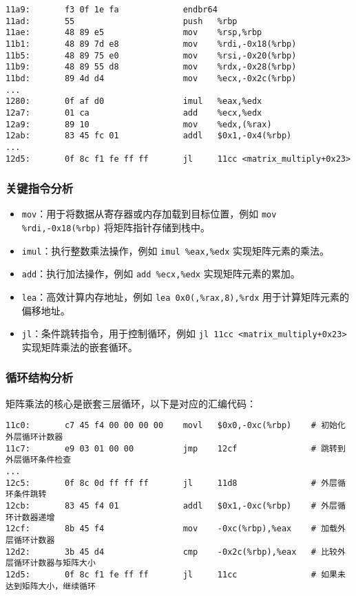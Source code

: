 \documentclass[a4paper,12pt]{ctexart}
\begin{document}
\begin{lstlisting}[caption={C语言实现的矩阵乘法关键汇编指令}]
11a9:       f3 0f 1e fa             endbr64
11ad:       55                      push   %rbp
11ae:       48 89 e5                mov    %rsp,%rbp
11b1:       48 89 7d e8             mov    %rdi,-0x18(%rbp)
11b5:       48 89 75 e0             mov    %rsi,-0x20(%rbp)
11b9:       48 89 55 d8             mov    %rdx,-0x28(%rbp)
11bd:       89 4d d4                mov    %ecx,-0x2c(%rbp)
...
1280:       0f af d0                imul   %eax,%edx
12a7:       01 ca                   add    %ecx,%edx
12a9:       89 10                   mov    %edx,(%rax)
12ab:       83 45 fc 01             addl   $0x1,-0x4(%rbp)
...
12d5:       0f 8c f1 fe ff ff       jl     11cc <matrix_multiply+0x23>
\end{lstlisting}

\subsubsection{关键指令分析}
\begin{itemize}
    \item \texttt{mov}：用于将数据从寄存器或内存加载到目标位置，例如 \texttt{mov \%rdi,-0x18(\%rbp)} 将矩阵指针存储到栈中。
    \item \texttt{imul}：执行整数乘法操作，例如 \texttt{imul \%eax,\%edx} 实现矩阵元素的乘法。
    \item \texttt{add}：执行加法操作，例如 \texttt{add \%ecx,\%edx} 实现矩阵元素的累加。
    \item \texttt{lea}：高效计算内存地址，例如 \texttt{lea 0x0(,\%rax,8),\%rdx} 用于计算矩阵元素的偏移地址。
    \item \texttt{jl}：条件跳转指令，用于控制循环，例如 \texttt{jl 11cc \textless{}matrix\_multiply+0x23\textgreater{}} 实现矩阵乘法的嵌套循环。
\end{itemize}

\subsubsection{循环结构分析}
矩阵乘法的核心是嵌套三层循环，以下是对应的汇编代码：
\begin{lstlisting}[caption={矩阵乘法的循环结构}]
11c0:       c7 45 f4 00 00 00 00    movl   $0x0,-0xc(%rbp)    # 初始化外层循环计数器
11c7:       e9 03 01 00 00          jmp    12cf               # 跳转到外层循环条件检查
...
12c5:       0f 8c 0d ff ff ff       jl     11d8               # 外层循环条件跳转
12cb:       83 45 f4 01             addl   $0x1,-0xc(%rbp)    # 外层循环计数器递增
12cf:       8b 45 f4                mov    -0xc(%rbp),%eax    # 加载外层循环计数器
12d2:       3b 45 d4                cmp    -0x2c(%rbp),%eax   # 比较外层循环计数器与矩阵大小
12d5:       0f 8c f1 fe ff ff       jl     11cc               # 如果未达到矩阵大小，继续循环
\end{lstlisting}
\end{document}
